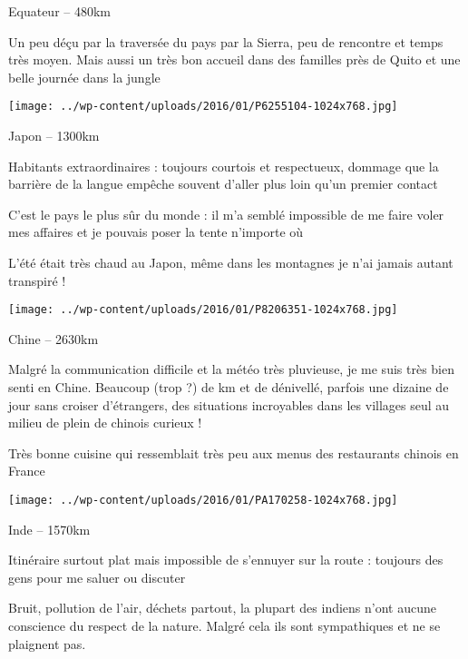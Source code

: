  

 Equateur – 480km 

 Un peu déçu par la traversée du pays par la Sierra, peu de rencontre et temps très moyen. Mais aussi un très bon accueil dans des familles près de Quito et une belle journée dans la jungle 

 

\begin{center} \texttt{[image: ../wp-content/uploads/2016/01/P6255104-1024x768.jpg]} \end{center}

 

 Japon – 1300km 

 Habitants extraordinaires : toujours courtois et respectueux, dommage que la barrière de la langue empêche souvent d'aller plus loin qu'un premier contact 

 C'est le pays le plus sûr du monde : il m'a semblé impossible de me faire voler mes affaires et je pouvais poser la tente n'importe où 

 L'été était très chaud au Japon, même dans les montagnes je n'ai jamais autant transpiré ! 

 

\begin{center} \texttt{[image: ../wp-content/uploads/2016/01/P8206351-1024x768.jpg]} \end{center}

 

 Chine – 2630km 

 Malgré la communication difficile et la météo très pluvieuse, je me suis très bien senti en Chine. Beaucoup (trop ?) de km et de dénivellé, parfois une dizaine de jour sans croiser d'étrangers, des situations incroyables dans les villages seul au milieu de plein de chinois curieux ! 

 Très bonne cuisine qui ressemblait très peu aux menus des restaurants chinois en France 

 

\begin{center} \texttt{[image: ../wp-content/uploads/2016/01/PA170258-1024x768.jpg]} \end{center}

 

 Inde – 1570km 

 Itinéraire surtout plat mais impossible de s'ennuyer sur la route : toujours des gens pour me saluer ou discuter 

 Bruit, pollution de l'air, déchets partout, la plupart des indiens n'ont aucune conscience du respect de la nature. Malgré cela ils sont sympathiques et ne se plaignent pas. 

